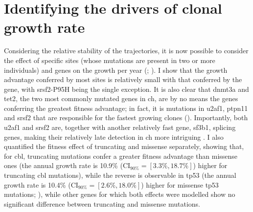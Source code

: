 \begin{figure}[!ht]
	\label{fig:performance-6th-tp}
\end{figure}

\section{Identifying the drivers of clonal growth rate}

Considering the relative stability of the trajectories, it is now possible to consider the effect of specific sites (whose mutations are present in two or more individuals) and genes on the growth per year (; ). I show that the growth advantage conferred by most sites is relatively small with that conferred by the gene, with \ac{srsf2}-P95H being the single exception. It is also clear that \ac{dnmt3a} and \ac{tet2}, the two most commonly mutated genes in \ac{ch}, are by no means the genes conferring the greatest fitness advantage; in fact, it is mutations in \ac{u2af1}, \ac{ptpn11} and \ac{srsf2} that are responsible for the fastest growing clones (). Importantly, both \ac{u2af1} and \ac{srsf2} are, together with another relatively fast gene, \ac{sf3b1}, splicing genes, making their relatively late detection in \ac{ch} more intriguing \cite{McKerrell2015-rl}. I also quantified the fitness effect of truncating and missense separately, showing that, for \ac{cbl}, truncating mutations confer a greater fitness advantage than missense ones (the annual growth rate is 10.9\% ($\mathrm{CI}_{90\%}=[3.3\%,18.7\%]$) higher for truncating \ac{cbl} mutations), while the reverse is observable in \ac{tp53} (the annual growth rate is 10.4\% ($\mathrm{CI}_{90\%}=[2.6\%,18.0\%]$) higher for missense \ac{tp53} mutations; ), while other genes for which both effects were modelled show no significant difference between truncating and missense mutations.

\begin{figure}[!ht]
	\label{fig:ch-gene-site-coefficients}
\end{figure}

